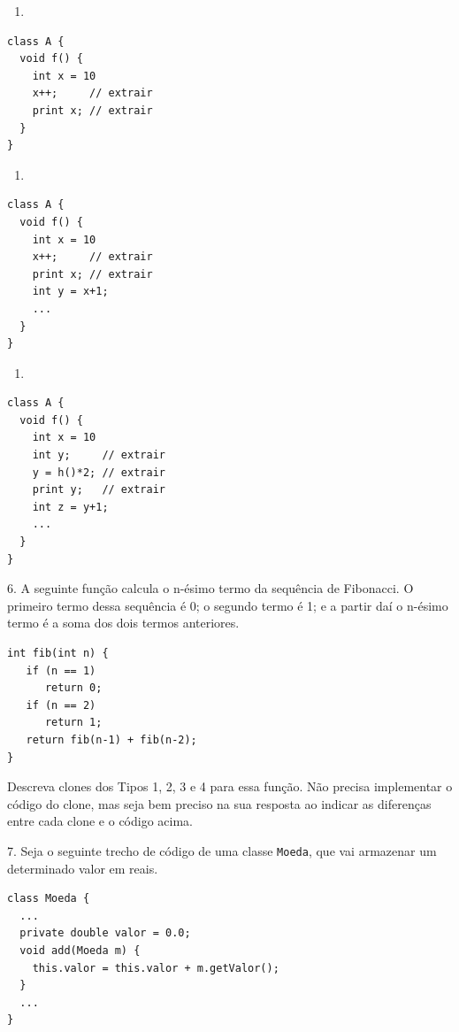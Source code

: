 \documentclass[
  11pt,
  twoside]{book}
\newcommand{\passthrough}[1]{#1}
\providecommand{\tightlist}{%
  \setlength{\itemsep}{0pt}\setlength{\parskip}{0pt}}
\begin{document}
\begin{enumerate}
\def\labelenumi{(\alph{enumi})}
\setcounter{enumi}{1}
\tightlist
\item
\end{enumerate}

\begin{lstlisting}
class A {
  void f() {
    int x = 10
    x++;     // extrair
    print x; // extrair
  }
}
\end{lstlisting}

\begin{enumerate}
\def\labelenumi{(\alph{enumi})}
\setcounter{enumi}{2}
\tightlist
\item
\end{enumerate}

\begin{lstlisting}
class A {
  void f() {
    int x = 10
    x++;     // extrair
    print x; // extrair
    int y = x+1;
    ...
  }
}
\end{lstlisting}

\begin{enumerate}
\def\labelenumi{(\alph{enumi})}
\setcounter{enumi}{3}
\tightlist
\item
\end{enumerate}

\begin{lstlisting}
class A {
  void f() {
    int x = 10
    int y;     // extrair
    y = h()*2; // extrair
    print y;   // extrair
    int z = y+1;
    ...
  }
}
\end{lstlisting}

6. A seguinte função calcula o n-ésimo termo da sequência de Fibonacci.
O primeiro termo dessa sequência é 0; o segundo termo é 1; e a partir
daí o n-ésimo termo é a soma dos dois termos anteriores.

\begin{lstlisting}
int fib(int n) {
   if (n == 1)
      return 0;
   if (n == 2)
      return 1;
   return fib(n-1) + fib(n-2);
}
\end{lstlisting}

Descreva clones dos Tipos 1, 2, 3 e 4 para essa função. Não precisa
implementar o código do clone, mas seja bem preciso na sua resposta ao
indicar as diferenças entre cada clone e o código acima.

7. Seja o seguinte trecho de código de uma classe
\passthrough{\lstinline!Moeda!}, que vai armazenar um determinado valor
em reais.

\begin{lstlisting}
class Moeda {
  ...
  private double valor = 0.0;
  void add(Moeda m) {
    this.valor = this.valor + m.getValor();
  } 
  ...
}
\end{lstlisting}
\end{document}
